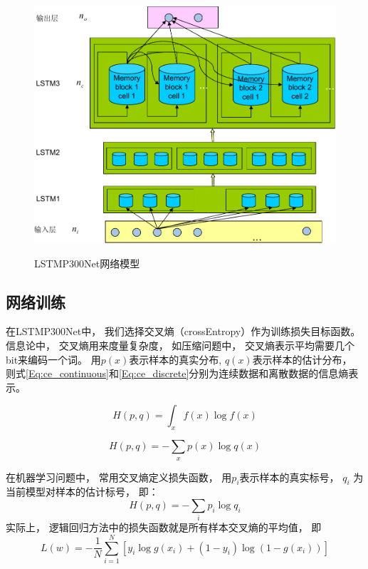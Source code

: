 \begin{figure}[htb]
  \centering
  \includegraphics{Pictures/LSTM/LSTMP300Net-crop.pdf}\\
  \caption{LSTMP300Net网络模型}\label{Fig:LSTMP300Net}
\end{figure}


\subsection{网络训练}
在LSTMP300Net中， 我们选择交叉熵（crossEntropy）作为训练损失目标函数。 信息论中， 交叉熵用来度量复杂度， 如压缩问题中， 交叉熵表示平均需要几个bit来编码一个词。 用$p(x)$表示样本的真实分布, $q(x)$表示样本的估计分布， 则式\ref{Eq:ce_continuous}和\ref{Eq:ce_discrete}分别为连续数据和离散数据的信息熵表示。 

\begin{equation}\label{Eq:ce_continuous}
	H(p,q) = \int_x f(x)\log f(x)
\end{equation}

\begin{equation}\label{Eq:ce_discrete}
	H(p,q) = -\sum_x p(x)\log q(x)
\end{equation}

在机器学习问题中， 常用交叉熵定义损失函数， 用$p_i$表示样本的真实标号， $q_i$ 为当前模型对样本的估计标号， 即：
\begin{equation}
	H(p,q)=-\sum_i{p_i\log q_i}
\end{equation}
实际上， 逻辑回归方法中的损失函数就是所有样本交叉熵的平均值， 即
\begin{equation}
	L(w) = -\frac{1}{N}\sum_{i=1}^N {[y_i \log g(x_i)+(1-y_i)\log (1-g(x_i))]}
\end{equation}

